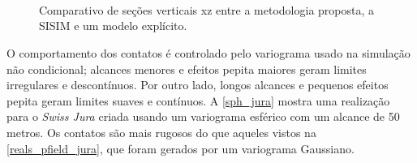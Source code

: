 \begin{figure}[H]
    \caption{Comparativo de seções verticais xz entre a metodologia proposta, a SISIM e um modelo explícito.} \label{sec_comp}
     \centering
     \\
     \\
     \\
\end{figure}

O comportamento dos contatos é controlado pelo variograma usado na simulação não condicional; alcances menores e efeitos pepita maiores geram limites irregulares e descontínuos. Por outro lado, longos alcances e pequenos efeitos pepita geram limites suaves e contínuos. A \autoref{sph_jura} mostra uma realização para o \textit{Swiss Jura} criada usando um variograma esférico com um alcance de 50 metros. Os contatos são mais rugosos do que aqueles vistos na \autoref{reals_pfield_jura}, que foram gerados por um variograma Gaussiano.

